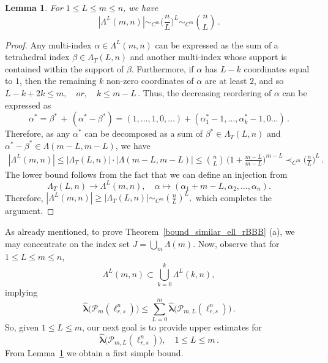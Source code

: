 \documentclass[12pt]{amsart}
\numberwithin{subsection}{section}
\newtheorem{lemma}[theorem]{Lemma}
\theoremstyle{definition}
\theoremstyle{remark}
\begin{document}
\begin{lemma}\label{cardinal J^L} 
For $1 \le L \le m \le n$, we have
\[
|\Lambda^{L}(m,n)|\sim_{C^m} \Big(\frac{n}{L}\Big)^{L} \sim_{C^m} \binom{n}{L}\,.
\]
\end{lemma}


\begin{proof}
Any multi-index $\alpha \in \Lambda^L(m,n)$ can be expressed as the sum of a tetrahedral index $\beta \in \Lambda_T(L,n)$
and another multi-index whose support is contained within the support of $\beta$. Furthermore, if $\alpha$ has $L-k$
coordinates equal to $1$, then the remaining $k$ non-zero coordinates of $\alpha$ are at least $2$, and so
$
L-k+2k\le m, \quad or,\quad k\le m-L\,.
$
Thus, the decreasing reordering of $\alpha$ can be expressed as
\[
\alpha^*=\beta^* \, + \,(\alpha^*-\beta^*)
=(1,\dots,1,0,\dots)+(\alpha_1^*-1,
\dots,\alpha_k^*-1,0\dots)\,.
\]
Therefore, as any $\alpha^*$ can be decomposed as a sum of $\beta^* \in \Lambda_T(L,n)$ and $\alpha^* - \beta^* \in \Lambda(m-L,m-L)$,
we have
\begin{align*}
|\Lambda^{L}(m,n)|\le |\Lambda_T(L,n)|\cdot|\Lambda(m-L,m-L)|\le \binom{n}{L} \,\Big(1+\frac{m-L}{m-L}\Big)^{m-L}
\prec_{C^m} \Big(\frac{n}{L}\Big)^{L}\,.
\end{align*}
The lower bound follows from the fact that we can define an injection from
\[
\Lambda_T(L,n) \to \Lambda^{L}(m,n), \quad \alpha \mapsto (\alpha_1 + m - L, \alpha_2, \dots, \alpha_n).
\]
Therefore,
$
|\Lambda^{L}(m,n)| \ge |\Lambda_T(L,n)| \sim_{C^m} \left(\frac{n}{L}\right)^{L},
$
which completes the argument.
\end{proof}


As already mentioned, to prove Theorem~\ref{bound_similar_ell_rBBB} (a), we may concentrate on the index set $J = \bigcup_m \Lambda(m)$.
Now, observe that for $1 \le L \le m \le n$,
\begin{equation*}\label{union}
\Lambda^L(m,n) \subset \bigcup_{k=0}^k \Lambda^L(k,n),
\end{equation*}
implying
\begin{equation}\label{dashunion}
\widehat{\boldsymbol{\lambda}}\big(\mathcal{P}_{m}(\ell_{r,s}^n)\big)
\le \sum_{L=0}^m \widehat{\boldsymbol{\lambda}}\big(\mathcal P_{m,L}(\ell_{r,s}^n)\big)\,.
\end{equation}
So, given \(1 \leq L \leq m\), our next goal is to provide upper estimates for
\[
\widehat{\boldsymbol{\lambda}}\big(\mathcal P_{m,L}(\ell_{r,s}^n)\big), \quad 1 \leq L \leq m\,.
\]
From Lemma~\ref{cardinal J^L} we obtain a first  simple bound.
\end{document}

